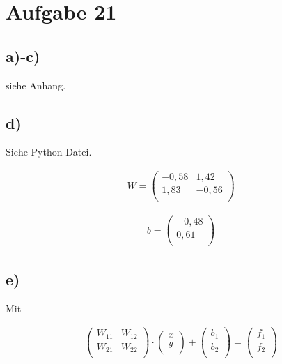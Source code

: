 \section{Aufgabe 21}
\subsection{a)-c)}
siehe Anhang.

\subsection{d)}
Siehe Python-Datei.

\begin{align*}
  W = \begin{pmatrix}
      -0,58 &  1,42 \\
      1,83  &  -0,56 \\
      \end{pmatrix}
\end{align*}

\begin{align*}
  b = \begin{pmatrix}
      -0,48 \\
      0,61 \\
      \end{pmatrix}
\end{align*}

\subsection{e)}
Mit

\begin{align}
  \begin{pmatrix}
    W_{11} & W_{12} \\
    W_{21} & W_{22} \\
  \end{pmatrix}
  \cdot
  \begin{pmatrix}
    x \\
    y \\
  \end{pmatrix}
   +
  \begin{pmatrix}
    b_1 \\
    b_2 \\
  \end{pmatrix}
   =
  \begin{pmatrix}
    f_1 \\
    f_2 \\
  \end{pmatrix}
\end{align}

